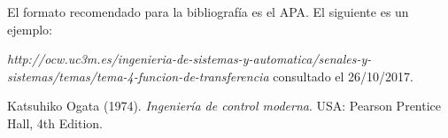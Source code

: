 \documentclass[12pt,letterpaper]{article}     %
\begin{document}



\newpage

El formato recomendado para la bibliografía es el APA. El siguiente es un ejemplo:

\begin{thebibliography}{}
 \emph{http://ocw.uc3m.es/ingenieria-de-sistemas-y-automatica/senales-y-sistemas/temas/tema-4-funcion-de-transferencia} consultado el 26/10/2017.

 Katsuhiko Ogata (1974). \emph{Ingeniería de control moderna}. USA:  Pearson Prentice Hall, 4th Edition.



\end{thebibliography}

\newpage


\end{document}
